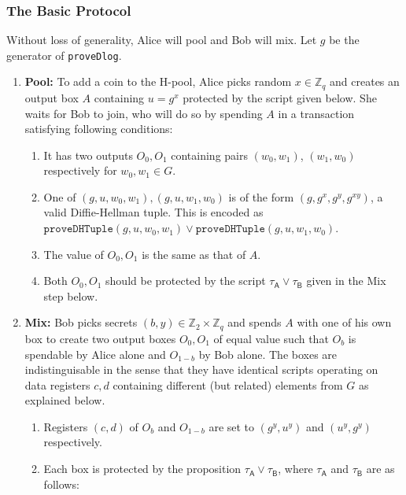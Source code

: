 \documentclass[11pt]{article}
\begin{document}
\subsubsection{The Basic Protocol}
 Without loss of generality, Alice will pool and Bob will mix. 
Let $g$ be the generator of \texttt{proveDlog}.
\begin{enumerate}
	\item \textbf{Pool:} To add a coin to the H-pool, Alice picks random $x\in \mathbb{Z}_q$ and creates an output box $A$ containing $u = g^x$ protected by the script given below. She waits for Bob to join, who will do so by spending $A$ in a transaction satisfying following conditions: 
	
	\begin{enumerate}
		\item It has two outputs $O_0, O_1$ containing pairs $(w_0, w_1)$, $(w_1, w_0)$ respectively for $w_0, w_1\in G$. 
		\item One of $(g, u, w_0, w_1), (g, u, w_1, w_0)$ is of the form $(g, g^x, g^y, g^{xy})$, a valid Diffie-Hellman tuple. This is encoded as $\texttt{proveDHTuple}(g, u, w_0, w_1)\lor \texttt{proveDHTuple}(g, u, w_1, w_0)$.
		\item The value of $O_0, O_1$ is the same as that of $A$.
		\item Both $O_0, O_1$ should be protected by the script $\tau_\textsf{A} \lor \tau_\textsf{B}$ given in the Mix step below.
	\end{enumerate}
	
	
	\item \textbf{Mix:} Bob picks secrets $(b, y) \in \mathbb{Z}_2\times \mathbb{Z}_q$ and spends $A$ with one of his own box to create two output boxes $O_0, O_1$ of equal value such that $O_b$ is spendable by Alice alone and $O_{1-b}$ by Bob alone. 
	The boxes are indistinguisable in the sense that they have identical scripts operating on  data registers $c, d$ containing different (but related) elements from $G$ as explained below. 
	\begin{enumerate}
		\item %
		Registers $(c, d)$ of $O_b$ and $O_{1-b}$ are set to $(g^y, u^y)$ and $(u^y, g^y)$ respectively. 
		\item Each box is protected by the proposition $\tau_\textsf{A} \lor \tau_\textsf{B}$, where $\tau_\textsf{A}$ and $\tau_\textsf{B}$ are as follows: 


\end{enumerate}
\end{enumerate}
\end{document}
